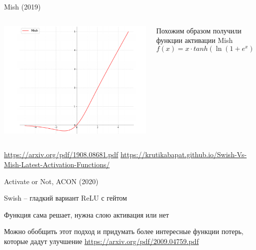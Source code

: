 \documentclass[notes,12pt, aspectratio=169]{beamer}
\newenvironment{wideitemize}{\itemize\addtolength{\itemsep}{10pt}}{\enditemize}
\begin{document}
\begin{frame}{Mish (2019)}
	\begin{columns}
		\begin{column}{0.5\textwidth}
			\begin{center}
				\includegraphics[width=.9\linewidth]{mish.png}
			\end{center}
		\end{column}
		\hfill
		\begin{column}{0.5\textwidth}
			Похожим образом получили функции активации Mish
				\[f(x) = x \cdot tanh(\ln(1 + e^x)) \]
		\end{column}
	\end{columns}
	\vfill %
	\footnotesize
	{\color{blue} \url{https://arxiv.org/pdf/1908.08681.pdf} \newline \url{https://krutikabapat.github.io/Swish-Vs-Mish-Latest-Activation-Functions/} }
\end{frame}


\begin{frame}{Activate or Not, ACON (2020)}
\begin{wideitemize} 
	\item  Swish -- гладкий вариант ReLU с гейтом 
	\item  Функция сама решает, нужна слою активация или нет 
	\item  Можно обобщить этот подход и придумать более интересные функции потерь, которые дадут улучшение
\end{wideitemize}	
\vfill %
\footnotesize
{\color{blue} \url{https://arxiv.org/pdf/2009.04759.pdf}}
\end{frame}


%
\end{document}
